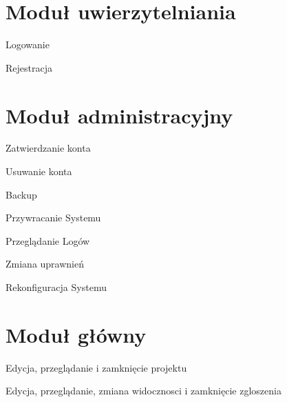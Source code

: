 \section{Moduł uwierzytelniania}

\begin{class}{Logowanie}
\end{class}

\begin{class}{Rejestracja}
\end{class}

\section{Moduł administracyjny}

\begin{class}{Zatwierdzanie konta}
\end{class}

\begin{class}{Usuwanie konta}
\end{class}

\begin{class}{Backup}
\end{class}

\begin{class}{Przywracanie Systemu}
\end{class}

\begin{class}{Przeglądanie Logów}
\end{class}

\begin{class}{Zmiana uprawnień}
\end{class}

\begin{class}{Rekonfiguracja Systemu}
\end{class}

\section{Moduł główny}
\begin{class}{Edycja, przeglądanie i zamknięcie projektu}
\end{class}

\begin{class}{Edycja, przeglądanie, zmiana widocznosci i zamknięcie zgloszenia}
\end{class}



